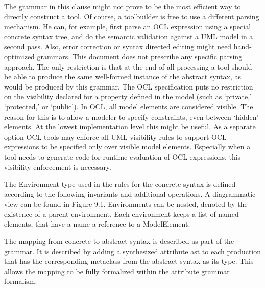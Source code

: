 \documentclass{scrreprt}   %
\begin{document}
The grammar in this clause might not prove to be the most efficient way to directly construct a tool. Of course, a toolbuilder
is free to use a different parsing mechanism. He can, for example, first parse an OCL expression using a special
concrete syntax tree, and do the semantic validation against a UML model in a second pass. Also, error correction or
syntax directed editing might need hand-optimized grammars. This document does not prescribe any specific parsing
approach. The only restriction is that at the end of all processing a tool should be able to produce the same well-formed
instance of the abstract syntax, as would be produced by this grammar.
The OCL specification puts no restriction on the visibility declared for a property defined in the model (such as ‘private,’
‘protected,’ or ‘public’). In OCL, all model elements are considered visible. The reason for this is to allow a modeler to
specify constraints, even between ‘hidden’ elements. At the lowest implementation level this might be useful.
As a separate option OCL tools may enforce all UML visibility rules to support OCL expressions to be specified only
over visible model elements. Especially when a tool needs to generate code for runtime evaluation of OCL expressions,
this visibility enforcement is necessary.

\label{ocl:BaseOCLConcreteSyntax}


\label{ocl:EssentialOCLConcreteSyntax}


\label{ocl:CompleteOCLConcreteSyntax}


The Environment type used in the rules for the concrete syntax is defined according to the following invariants and
additional operations. A diagrammatic view can be found in Figure 9.1. Environments can be nested, denoted by the
existence of a parent environment. Each environment keeps a list of named elements, that have a name a reference to a
ModelElement.

The mapping from concrete to abstract syntax is described as part of the grammar. It is described by adding a synthesized
attribute ast to each production that has the corresponding metaclass from the abstract syntax as its type. This allows the
mapping to be fully formalized within the attribute grammar formalism.
\end{document}

